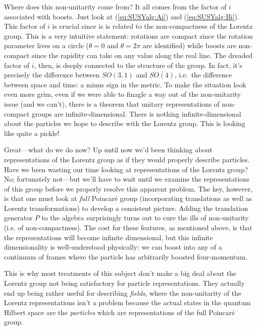 \documentclass[12pt, oneside]{report}    %
\begin{document}
Where does this non-unitarity come from? It all comes from the factor of $i$ associated with boosts. Just look at (\ref{eq:SUSYalg:Ai}) and (\ref{eq:SUSYalg:Bi}). This factor of $i$ is crucial since is is related to the non-compactness of the Lorentz group. This is a very intuitive statement: rotations are compact since the rotation parameter lives on a circle ($\theta=0$ and $\theta=2\pi$ are identified) while boosts are non-compact since the rapidity can take on any value along the real line. The dreaded factor of $i$, then, is deeply connected to the structure of the group. In fact, it's precisely the difference between $SO(3,1)$ and $SO(4)$, i.e.\ the difference between space and time: a minus sign in the metric. To make the situation look even more grim, even if we were able to finagle a way out of the non-unitarity issue (and we can't), there is a theorem that unitary representations of non-compact groups are infinite-dimensional. There is nothing infinite-dimensional about the particles we hope to describe with the Lorentz group. This is looking like quite a pickle!

Great---what do we do now? Up until now we'd been thinking about representations of the Lorentz group as if they would properly describe particles. Have we been wasting our time looking at representations of the Lorentz group? No; fortunately not---but we'll have to wait until we examine the representations of this group before we properly resolve this apparent problem. The key, however, is that one must look at \textit{full} Poincar\'e group (incorporating translations as well as Lorentz transformations) to develop a consistent picture. Adding the translation generator $P$ to the algebra surprisingly turns out to cure the ills of non-unitarity (i.e. of non-compactness). The cost for these features, as mentioned above, is that the representations will become infinite dimensional, but this infinite dimensionality is well-understood physically: we can boost into any of a continuum of frames where the particle has arbitrarily boosted four-momentum. %

This is why most treatments of this subject don't make a big deal about the Lorentz group not being satisfactory for particle representations. They actually end up being rather useful for describing \textit{fields}, where the non-unitarity of the Lorentz representations isn't a problem because the actual states in the quantum Hilbert space are the \textit{particles} which are representations of the full Poincar\'e group. %
\end{document}
